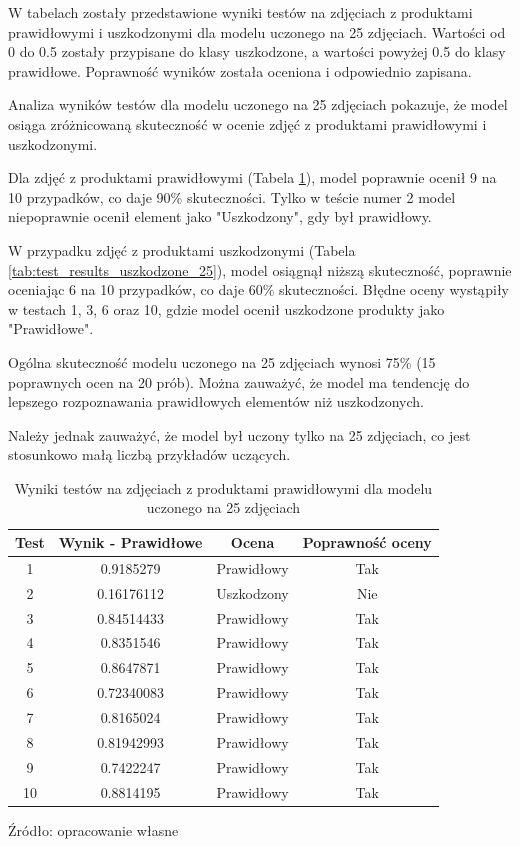 W tabelach zostały przedstawione wyniki testów na zdjęciach z produktami prawidłowymi i uszkodzonymi dla modelu uczonego na 25 zdjęciach. Wartości od 0 do 0.5 zostały przypisane do klasy uszkodzone, a wartości powyżej 0.5 do klasy prawidłowe. Poprawność wyników została oceniona i odpowiednio zapisana. 

Analiza wyników testów dla modelu uczonego na 25 zdjęciach pokazuje, że model osiąga zróżnicowaną skuteczność w ocenie zdjęć z produktami prawidłowymi i uszkodzonymi.

Dla zdjęć z produktami prawidłowymi (Tabela \ref{tab:test_results_prawidlowe_25}), model poprawnie ocenił 9 na 10 przypadków, co daje 90\% skuteczności. Tylko w teście numer 2 model niepoprawnie ocenił element jako "Uszkodzony", gdy był prawidłowy.

W przypadku zdjęć z produktami uszkodzonymi (Tabela \ref{tab:test_results_uszkodzone_25}), model osiągnął niższą skuteczność, poprawnie oceniając 6 na 10 przypadków, co daje 60\% skuteczności. Błędne oceny wystąpiły w testach 1, 3, 6 oraz 10, gdzie model ocenił uszkodzone produkty jako "Prawidłowe".

Ogólna skuteczność modelu uczonego na 25 zdjęciach wynosi 75\% (15 poprawnych ocen na 20 prób). Można zauważyć, że model ma tendencję do lepszego rozpoznawania prawidłowych elementów niż uszkodzonych.

Należy jednak zauważyć, że model był uczony tylko na 25 zdjęciach, co jest stosunkowo małą liczbą przykładów uczących. 

\begin{table}[H]
\centering
\caption{Wyniki testów na zdjęciach z produktami prawidłowymi dla modelu uczonego na 25 zdjęciach}
\begin{tabular}{|c|c|c|c|}
\hline
\textbf{Test} & \textbf{Wynik - Prawidłowe} & \textbf{Ocena} & \textbf{Poprawność oceny} \\ \hline
1  & 0.9185279 & Prawidłowy & Tak \\ \hline
2  & 0.16176112 & Uszkodzony & Nie \\ \hline
3  & 0.84514433 & Prawidłowy & Tak \\ \hline
4  & 0.8351546 & Prawidłowy & Tak \\ \hline
5  & 0.8647871 & Prawidłowy & Tak \\ \hline
6  & 0.72340083 & Prawidłowy & Tak \\ \hline
7  & 0.8165024 & Prawidłowy & Tak \\ \hline
8  & 0.81942993 & Prawidłowy & Tak \\ \hline
9  & 0.7422247 & Prawidłowy & Tak \\ \hline
10 & 0.8814195 & Prawidłowy & Tak \\ \hline
\end{tabular}
\begin{center}
\footnotesize{Źródło: opracowanie własne}
\end{center}
\label{tab:test_results_prawidlowe_25}
\end{table}


